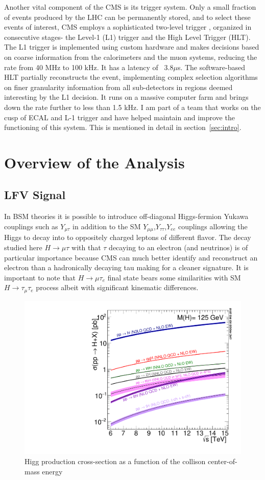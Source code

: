 \documentclass[a4paper,11pt]{article}
\begin{document}
Another vital component of the CMS is its trigger system. Only a small fraction of events produced by the LHC can be permanently stored, and to select these events of interest, CMS employs a sophisticated two-level trigger , organized in consecutive stages- the Level-1 (L1) trigger and the High Level Trigger (HLT). The L1 trigger is implemented using custom hardware and makes decisions based on coarse information from the calorimeters and the muon systems, reducing the rate from 40 MHz to 100 kHz. It has a latency of ~3.8$\mu$s. The software-based HLT partially reconstructs the event, implementing complex selection algorithms on finer granularity information from all sub-detectors in regions deemed interesting by the L1 decision. It runs on a massive computer farm and brings down the rate further to less than 1.5 kHz. I am part of a team that works on the cusp of ECAL and L-1 trigger and have helped maintain and improve the functioning of this system. This is mentioned in detail in section~\ref{sec:intro}.


\section {Overview of the Analysis}
\subsection{LFV Signal}
In BSM theories it is possible to introduce off-diagonal Higgs-fermion Yukawa couplings such as $Y_{\mu\tau}$ in addition to the SM $Y_{\mu\mu}$,$Y_{\tau\tau}$,$Y_{ee}$ couplings allowing the Higgs to decay into to oppositely charged leptons of different flavor.  The decay studied here $H\rightarrow \mu\tau$ with that $\tau$ decaying to an electron (and neutrinos) is of particular importance because CMS can much better identify and reconstruct an electron than a hadronically decaying tau making for a cleaner signature. It is important to note that $H\rightarrow \mu\tau_{e}$ final state bears some similarities with SM $H\rightarrow \tau_{\mu}\tau_{e}$ process albeit with significant kinematic differences.
\begin{figure}
  \centering
    \includegraphics[width=.46\textwidth]{Plot_Escan_H125_new_sqrt.pdf}
  \caption{\label{fig:c} Higg production cross-section as a function of the collison center-of-mass energy  }
\end{figure}
\end{document}

